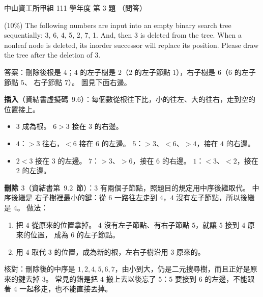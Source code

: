 \begin{pastexam}[label={px:nsysu-111-osds-03}]{中山資工所甲組 111 學年度 第 3 題}
（問答）

(10\%) The following numbers are input into an empty binary search tree sequentially: 3, 6, 4, 5,
2, 7, 1. And, then 3 is deleted from the tree. When a nonleaf node is deleted, its inorder successor
will replace its position. Please draw the tree after the deletion of 3.
\end{pastexam}

\begin{pastsoln}
答案：刪除後根是 $4$；$4$ 的左子樹是 $2$（$2$ 的左子節點 $1$），右子樹是 $6$（$6$ 的左子節點 $5$、
右子節點 $7$）。 圖見下面右邊。

\textbf{插入}（資結書虛擬碼~9.6）：每個數從根往下比，小的往左、大的往右，走到空的位置接上。
\begin{itemize}
\item $3$ 成為根。 $6 > 3$ 接在 $3$ 的右邊。
\item $4$：$> 3$ 往右，$< 6$ 接在 $6$ 的左邊。 $5$：$> 3$、$< 6$、$> 4$，接在 $4$ 的右邊。
\item $2 < 3$ 接在 $3$ 的左邊。 $7$：$> 3$、$> 6$，接在 $6$ 的右邊。 $1$：$< 3$、$< 2$，接在
$2$ 的左邊。
\end{itemize}

\textbf{刪除 $3$}（資結書第~9.2~節）：$3$ 有兩個子節點，照題目的規定用中序後繼取代。 中序後繼是
右子樹裡最小的鍵：從 $6$ 一路往左走到 $4$，$4$ 沒有左子節點，所以後繼是 $4$。 做法：
\begin{enumerate}
\item 把 $4$ 從原來的位置拿掉。 $4$ 沒有左子節點、有右子節點 $5$，就讓 $5$ 接到 $4$ 原來的位置，
成為 $6$ 的左子節點。
\item 用 $4$ 取代 $3$ 的位置，成為新的根，左右子樹沿用 $3$ 原來的。
\end{enumerate}

\begin{center}
\end{center}

核對：刪除後的中序是 $1, 2, 4, 5, 6, 7$，由小到大，仍是二元搜尋樹，而且正好是原來的鍵去掉 $3$。
常見的錯是把 $4$ 搬上去以後忘了 $5$：$5$ 要接到 $6$ 的左邊，不能跟著 $4$ 一起移走，也不能直接丟掉。
\end{pastsoln}
